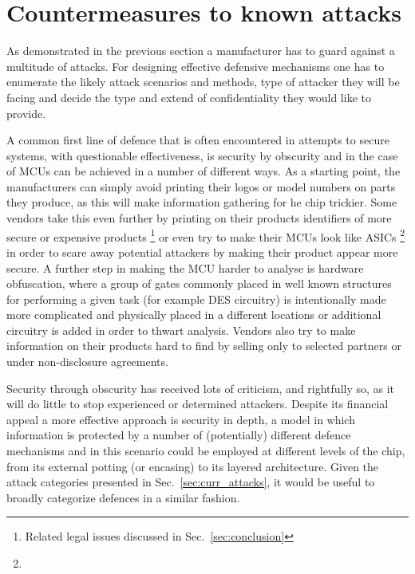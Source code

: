 \section{Countermeasures to known attacks}
\label{sec:defenses}

As demonstrated in the previous section a manufacturer has to guard against a multitude of attacks. For designing effective defensive mechanisms one has to enumerate the likely attack scenarios and methods, type of attacker they will be facing and decide the type and extend of confidentiality they would like to provide\citep{sergei:thesis}\citep{kocher:DPA}.

A common first line of defence that is often encountered in attempts to secure systems, with questionable effectiveness, is security by obscurity and in the case of MCUs can be achieved in a number of different ways. As a starting point, the manufacturers can simply avoid printing their logos or model numbers on parts they produce, as this will make information gathering for he chip trickier. Some vendors take this even further by printing on their products identifiers of more secure or expensive products \footnote{Related legal issues discussed in Sec.~\ref{sec:conclusion}} or even try to make their MCUs look like ASICs \footnote{} in order to scare away potential attackers by making their product appear more secure\citep{sergei:thesis}. A further step in making the MCU harder to analyse is hardware obfuscation, where a group of gates commonly placed in well known structures for performing a given task (for example DES circuitry) is intentionally made more complicated and physically placed in a different locations or additional circuitry is added in order to thwart analysis\citep{anderson:cautionary_note}. Vendors also try to make information on their products hard to find by selling only to selected partners or under non-disclosure agreements\citep{sergei:thesis}.

Security through obscurity has received lots of criticism, and rightfully so, as it will do little to stop experienced or determined attackers. Despite its financial appeal a more effective approach is security in depth, a model in which information is protected by a number of (potentially) different defence mechanisms and in this scenario could be employed at different levels of the chip, from its external potting (or encasing) to its layered architecture. Given the attack categories presented in Sec.~\ref{sec:curr_attacks}, it would be useful to broadly categorize defences in a similar fashion.

